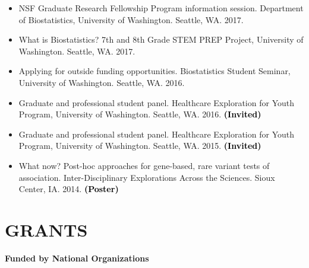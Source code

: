 \documentclass[margin]{res}
\newcommand{\annotate}[1]{\textcolor{black}{\textbf{(#1)}}}
\begin{document}
\begin{resume}
\begin{itemize}
\item[6.] %
NSF Graduate Research Fellowship Program information session. 
Department of Biostatistics, University of Washington. Seattle, WA. 2017.

\item[5.] %
What is Biostatistics? 
7th and 8th Grade STEM PREP Project, University of Washington. Seattle, WA. 2017. %

\item[4.] %
Applying for outside funding opportunities. 
Biostatistics Student Seminar, University of Washington. Seattle, WA. 2016.

\item[3.] Graduate and professional student panel. 
Healthcare Exploration for Youth Program, University of Washington. Seattle, WA. 2016. 
\annotate{Invited}

\item[2.] Graduate and professional student panel. 
Healthcare Exploration for Youth Program, University of Washington. Seattle, WA. 2015. 
\annotate{Invited}

\item[1.] %
What now? Post-hoc approaches for gene-based, rare variant tests of association. 
Inter-Disciplinary Explorations Across the Sciences. Sioux Center, IA. 2014.  
\annotate{Poster}\\%

\end{itemize}




\section{GRANTS}

\textbf{Funded by National Organizations}
\begin{itemize}



\end{itemize}
\end{resume}
\end{document}

